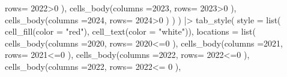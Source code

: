 \documentclass[
  12pt]{article}
\newenvironment{Shaded}{\begin{snugshade}}{\end{snugshade}}
\newcommand{\AttributeTok}[1]{\textcolor[rgb]{0.40,0.45,0.13}{#1}}
\newcommand{\DecValTok}[1]{\textcolor[rgb]{0.68,0.00,0.00}{#1}}
\newcommand{\FunctionTok}[1]{\textcolor[rgb]{0.28,0.35,0.67}{#1}}
\newcommand{\NormalTok}[1]{\textcolor[rgb]{0.00,0.23,0.31}{#1}}
\newcommand{\SpecialCharTok}[1]{\textcolor[rgb]{0.37,0.37,0.37}{#1}}
\newcommand{\StringTok}[1]{\textcolor[rgb]{0.13,0.47,0.30}{#1}}
\theoremstyle{definition}
\theoremstyle{remark}
\begin{document}
\begin{Shaded}
\begin{Highlighting}[]
                 \AttributeTok{rows=} \StringTok{\textasciigrave{}}\AttributeTok{2022}\StringTok{\textasciigrave{}}\SpecialCharTok{\textgreater{}}\DecValTok{0}\NormalTok{ ), }
       \FunctionTok{cells\_body}\NormalTok{(}\AttributeTok{columns =}\StringTok{\textasciigrave{}}\AttributeTok{2023}\StringTok{\textasciigrave{}}\NormalTok{, }
                 \AttributeTok{rows=} \StringTok{\textasciigrave{}}\AttributeTok{2023}\StringTok{\textasciigrave{}}\SpecialCharTok{\textgreater{}}\DecValTok{0}\NormalTok{ ), }
      \FunctionTok{cells\_body}\NormalTok{(}\AttributeTok{columns =}\StringTok{\textasciigrave{}}\AttributeTok{2024}\StringTok{\textasciigrave{}}\NormalTok{, }
                 \AttributeTok{rows=} \StringTok{\textasciigrave{}}\AttributeTok{2024}\StringTok{\textasciigrave{}}\SpecialCharTok{\textgreater{}}\DecValTok{0}\NormalTok{ )}
\NormalTok{    )}
\NormalTok{  ) }\SpecialCharTok{|\textgreater{}} 
  \FunctionTok{tab\_style}\NormalTok{(}
    \AttributeTok{style =} \FunctionTok{list}\NormalTok{(}
      \FunctionTok{cell\_fill}\NormalTok{(}\AttributeTok{color =} \StringTok{"red"}\NormalTok{), }
      \FunctionTok{cell\_text}\NormalTok{(}\AttributeTok{color =} \StringTok{"white"}\NormalTok{)), }
        \AttributeTok{locations =} \FunctionTok{list}\NormalTok{(}
      \FunctionTok{cells\_body}\NormalTok{(}\AttributeTok{columns =}\StringTok{\textasciigrave{}}\AttributeTok{2020}\StringTok{\textasciigrave{}}\NormalTok{, }
                 \AttributeTok{rows=} \StringTok{\textasciigrave{}}\AttributeTok{2020}\StringTok{\textasciigrave{}}\SpecialCharTok{\textless{}=}\DecValTok{0}\NormalTok{ ), }
      \FunctionTok{cells\_body}\NormalTok{(}\AttributeTok{columns =}\StringTok{\textasciigrave{}}\AttributeTok{2021}\StringTok{\textasciigrave{}}\NormalTok{, }
                 \AttributeTok{rows=} \StringTok{\textasciigrave{}}\AttributeTok{2021}\StringTok{\textasciigrave{}}\SpecialCharTok{\textless{}=}\DecValTok{0}\NormalTok{ ), }
       \FunctionTok{cells\_body}\NormalTok{(}\AttributeTok{columns =}\StringTok{\textasciigrave{}}\AttributeTok{2022}\StringTok{\textasciigrave{}}\NormalTok{, }
                 \AttributeTok{rows=} \StringTok{\textasciigrave{}}\AttributeTok{2022}\StringTok{\textasciigrave{}}\SpecialCharTok{\textless{}=}\DecValTok{0}\NormalTok{ ), }
       \FunctionTok{cells\_body}\NormalTok{(}\AttributeTok{columns =}\StringTok{\textasciigrave{}}\AttributeTok{2022}\StringTok{\textasciigrave{}}\NormalTok{, }
                 \AttributeTok{rows=} \StringTok{\textasciigrave{}}\AttributeTok{2022}\StringTok{\textasciigrave{}}\SpecialCharTok{\textless{}=} \DecValTok{0}\NormalTok{ ), }

\end{Highlighting}
\end{Shaded}
\end{document}

